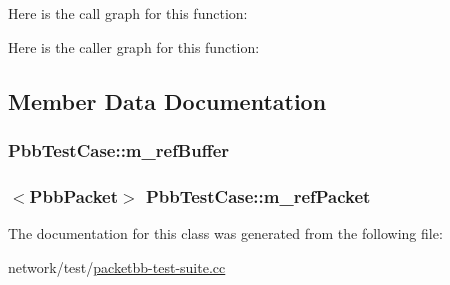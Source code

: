 Here is the call graph for this function\+:




Here is the caller graph for this function\+:




\subsection{Member Data Documentation}
\subsubsection[{\texorpdfstring{m\+\_\+ref\+Buffer}{m_refBuffer}}]{ Pbb\+Test\+Case\+::m\+\_\+ref\+Buffer\hspace{0.3cm}{\ttfamily [private]}}\hypertarget{classPbbTestCase_aaa5750b8393d6deb7cc0c412d3ad1291}{}\label{classPbbTestCase_aaa5750b8393d6deb7cc0c412d3ad1291}
\subsubsection[{\texorpdfstring{m\+\_\+ref\+Packet}{m_refPacket}}]{$<${\bf Pbb\+Packet}$>$ Pbb\+Test\+Case\+::m\+\_\+ref\+Packet\hspace{0.3cm}{\ttfamily [private]}}\hypertarget{classPbbTestCase_a819b8164513c849b4aa7fb6e161c270b}{}\label{classPbbTestCase_a819b8164513c849b4aa7fb6e161c270b}


The documentation for this class was generated from the following file\+:\begin{DoxyCompactItemize}
\item 
network/test/\hyperlink{packetbb-test-suite_8cc}{packetbb-\/test-\/suite.\+cc}\end{DoxyCompactItemize}
